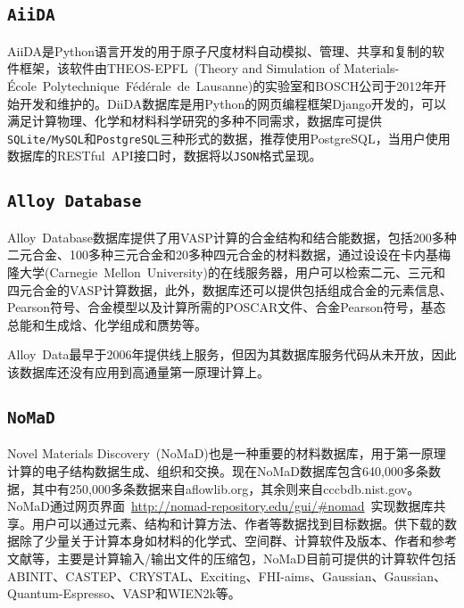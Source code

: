 \subsection{\tt{AiiDA}}
\textrm{AiiDA}\cite{AiiDA_URL}是\textrm{Python}语言开发的用于原子尺度材料自动模拟、管理、共享和复制的软件框架，该软件由\textrm{THEOS-EPFL~(Theory and Simulation of Materials-{\'E}cole~Polytechnique~F{\'e}d{\'e}rale~de~Lausanne)}的实验室和\textrm{BOSCH}公司于2012年开始开发和维护的。\textrm{DiiDA}数据库是用\textrm{Python}的网页编程框架\textrm{Django}开发的\cite{CMS187-110086_2021}，可以满足计算物理、化学和材料科学研究的多种不同需求，数据库可提供\texttt{SQLite/MySQL}和\texttt{PostgreSQL}三种形式的数据，推荐使用\textrm{PostgreSQL}，当用户使用数据库的\textrm{RESTful~API}接口时，数据将以\texttt{JSON}格式呈现。

\subsection{\tt{Alloy Database}}
\textrm{Alloy~Database}数据库提供了用\textrm{VASP}计算的合金结构和结合能数据\cite{AlloyD_URL}，包括200多种二元合金、100多种三元合金和20多种四元合金的材料数据，通过设设在卡内基梅隆大学\textrm{(Carnegie~Mellon~University)}的在线服务器，用户可以检索二元、三元和四元合金的\textrm{VASP}计算数据，此外，数据库还可以提供包括组成合金的元素信息、\textrm{Pearson}符号、合金模型以及计算所需的\textrm{POSCAR}文件、合金\textrm{Pearson}符号，基态总能和生成焓、化学组成和赝势等。

\textrm{Alloy~Data}最早于2006年提供线上服务，但因为其数据库服务代码从未开放，因此该数据库还没有应用到高通量第一原理计算上。

\subsection{\tt{NoMaD}}
\textrm{Novel Materials Discovery~(NoMaD)}也是一种重要的材料数据库，用于第一原理计算的电子结构数据生成、组织和交换\cite{NoMaD_URL}。现在\textrm{NoMaD}数据库包含640,000多条数据，其中有250,000多条数据来自\textrm{aflowlib.org}，其余则来自\textrm{cccbdb.nist.gov}。\textrm{NoMaD}通过网页界面~\textrm{\url{http://nomad-repository.edu/gui/\#nomad}}~实现数据库共享。用户可以通过元素、结构和计算方法、作者等数据找到目标数据。供下载的数据除了少量关于计算本身如材料的化学式、空间群、计算软件及版本、作者和参考文献等，主要是计算输入/输出文件的压缩包，\textrm{NoMaD}目前可提供的计算软件包括\textrm{ABINIT}、\textrm{CASTEP}、\textrm{CRYSTAL}、\textrm{Exciting}、\textrm{FHI-aims}、\textrm{Gaussian}、\textrm{Gaussian}、\textrm{Quantum-Espresso}、\textrm{VASP}和\textrm{WIEN2k}等。

